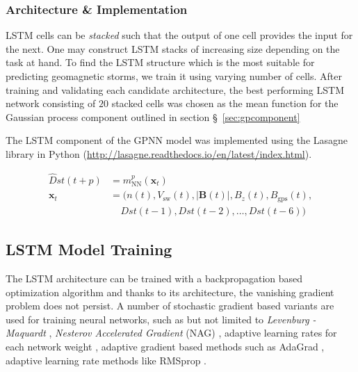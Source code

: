 \subsubsection*{Architecture \& Implementation}

LSTM cells can be \emph{stacked} such that the output of one cell provides the input for the next. One 
may construct LSTM stacks of increasing size depending on the task at hand. To find the LSTM structure which 
is the most suitable for predicting geomagnetic storms, we train it using varying number of cells. After 
training and validating each candidate architecture, the best performing LSTM network consisting of $20$ 
stacked cells was chosen as the mean function for the Gaussian process component outlined in 
section \S~\ref{sec:gpcomponent} 

The LSTM component of the GPNN model was implemented using the Lasagne library in Python 
(\url{http://lasagne.readthedocs.io/en/latest/index.html}). 

\begin{equation}\label{eq:dstmodel}
	\begin{aligned}
		\hat{D}st \left( t+p \right) &= m^{p}_{\text{NN}} (\mathbf{x}_t) \\
		\mathbf{x}_t &= (n \left( t \right) , V_{\text{sw}}\left( t \right), 
		|\mathbf{B}\left( t \right)|, B_{z}\left( t \right) , B_{\text{gps}} \left( t \right),\\ 
		& \ \  \ \  \ Dst \left( t-1 \right) ,Dst \left( t-2 \right) , \ldots , Dst \left( t-6 \right) )
	\end{aligned}
\end{equation}

\subsection{LSTM Model Training}

The LSTM architecture can be trained with a backpropagation based optimization algorithm and thanks to 
its architecture, the vanishing gradient problem does not persist. A number of stochastic gradient based 
variants are used for training neural networks, such as but not limited to \emph{Levenburg - Maquardt} 
\citep{marquardt1963algorithm}, \emph{Nesterov Accelerated Gradient} (NAG) \citep{nesterov1983method}, 
adaptive learning rates for each network weight \citep{SilvaAlmeida}, adaptive gradient based methods such as 
AdaGrad \citep{duchi2011adaptive}, adaptive learning rate methods like RMSprop \citep{tieleman2012lecture}. 

